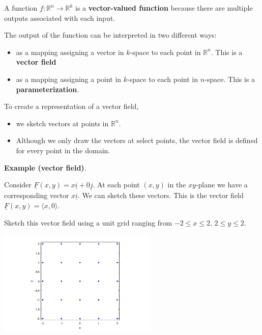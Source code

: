 \documentclass[12pt,letterpaper,noanswers]{exam}
\newcommand{\mb}[1]{\underline{#1}}
\begin{document}
\begin{tcolorbox}
 A function $f: \mathbb{R}^n \rightarrow \mathbb{R}^k$ is a \textbf{vector-valued function} because there are multiple outputs associated with each input.  
    
    The output of the function can be interpreted in two different ways: 
    \begin{itemize} 
    \itemsep0em
    \item as a mapping assigning a vector in $k$-space to each point in $\mathbb{R}^n$.  This is a \textbf{vector field}
    \item as a mapping assigning a point in $k$-space to each point in $n$-space.  This is a \textbf{parameterization}.
    \end{itemize}
    
To create a representation of a vector field, 
\begin{itemize}
    \itemsep0em
\item we sketch vectors at points in $\mathbb{R}^n$.  
\item Although we only draw the vectors at select points, the
vector field is defined for every point in the domain. \\
\end{itemize}
\end{tcolorbox}



\noindent\textbf{Example (vector field)}.  
\begin{multicols}{2}
Consider
$\mb F(x,y) = x\mb i + 0 \mb j.$  At each point $(x,y)$ in the $xy$-plane we have a corresponding vector $x\mb i$.  We can sketch these vectors.  This is the vector field $\mb F(x,y) = \langle x,0\rangle$.



Sketch this vector field using a unit grid ranging from $-2\leq x \leq 2$, $2\leq y\leq 2$.

\includegraphics[width=3in]{img/C17grid.png}
\end{multicols}
\end{document}
